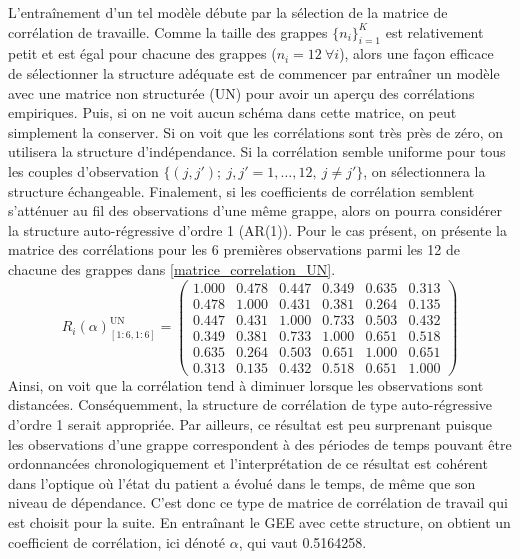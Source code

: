 \documentclass{article}
\begin{document}
	L'entraînement d'un tel modèle débute par la sélection de la matrice de corrélation de travaille.
	Comme la taille des grappes $\{n_i\}_{i=1}^K$ est relativement petit et est égal pour chacune des grappes ($n_i=12\ \forall i$), alors une façon efficace de sélectionner la structure adéquate est de commencer par entraîner un modèle avec une matrice non structurée (UN) pour avoir un aperçu des corrélations empiriques. Puis, si on ne voit aucun schéma dans cette matrice, on peut simplement la conserver. Si on voit que les corrélations sont très près de zéro, on utilisera la structure d'indépendance. Si la corrélation semble uniforme pour tous les couples d'observation $\{(j, j');\ j,j'=1,\dots,12,\ j \neq j'\}$, on sélectionnera la structure échangeable. Finalement, si les coefficients de corrélation semblent s'atténuer au fil des observations d'une même grappe, alors on pourra considérer la structure auto-régressive d'ordre 1 (AR(1)).
	Pour le cas présent, on présente la matrice des corrélations pour les 6 premières observations parmi les 12 de chacune des grappes dans \eqref{matrice_correlation_UN}.
	\begin{equation}\label{matrice_correlation_UN}
		R_i(\alpha)^{\mathrm{UN}}_{[1:6, 1:6]} =
		\begin{pmatrix}
			1.000 & 0.478 & 0.447 & 0.349 & 0.635 & 0.313 \\
			0.478 & 1.000 & 0.431 & 0.381 & 0.264 & 0.135 \\
			0.447 & 0.431 & 1.000 & 0.733 & 0.503 & 0.432 \\
			0.349 & 0.381 & 0.733 & 1.000 & 0.651 & 0.518 \\
			0.635 & 0.264 & 0.503 & 0.651 & 1.000 & 0.651 \\
			0.313 & 0.135 & 0.432 & 0.518 & 0.651 & 1.000
		\end{pmatrix}
	\end{equation}
	Ainsi, on voit que la corrélation tend à diminuer lorsque les observations sont distancées. Conséquemment, la structure de corrélation de type auto-régressive d'ordre 1 serait appropriée. Par ailleurs, ce résultat est peu surprenant puisque les observations d'une grappe correspondent à des périodes de temps pouvant être ordonnancées chronologiquement et l'interprétation de ce résultat est cohérent dans l'optique où l'état du patient a évolué dans le temps, de même que son niveau de dépendance. C'est donc ce type de matrice de corrélation de travail qui est choisit pour la suite. En entraînant le GEE avec cette structure, on obtient un coefficient de corrélation, ici dénoté $\alpha$, qui vaut 0.5164258.
\end{document}
